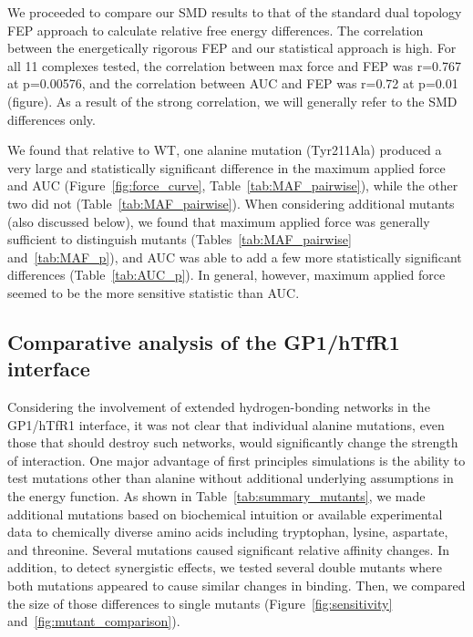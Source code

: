 \documentclass[12pt]{article}
\begin{document}
We proceeded to compare our SMD results to that of the standard dual topology FEP approach to calculate relative free energy differences. The correlation between the energetically rigorous FEP and our statistical approach is high. For all 11 complexes tested, the correlation between max force and FEP was r=0.767 at p=0.00576, and the correlation between AUC and FEP was r=0.72 at p=0.01 (figure). As a result of the strong correlation, we will generally refer to the SMD differences only.

We found that relative to WT, one alanine mutation (Tyr211Ala) produced a very large and statistically significant difference in the maximum applied force and AUC (Figure~\ref{fig:force_curve}, Table~\ref{tab:MAF_pairwise}), while the other two did not (Table~\ref{tab:MAF_pairwise}). When considering additional mutants (also discussed below), we found that maximum applied force was generally sufficient to distinguish mutants (Tables~\ref{tab:MAF_pairwise} and~\ref{tab:MAF_p}), and AUC was able to add a few more statistically significant differences (Table~\ref{tab:AUC_p}). In general, however, maximum applied force seemed to be the more sensitive statistic than AUC.

\subsection{Comparative analysis of the GP1/hTfR1 interface}
Considering the involvement of extended hydrogen-bonding networks in the GP1/hTfR1 interface, it was not clear that individual alanine mutations, even those that should destroy such networks, would significantly change the strength of interaction. One major advantage of first principles simulations is the ability to test mutations other than alanine without additional underlying assumptions in the energy function. As shown in Table~\ref{tab:summary_mutants}, we made additional mutations based on biochemical intuition or available experimental data to chemically diverse amino acids including tryptophan, lysine, aspartate, and threonine. Several mutations caused significant relative affinity changes. In addition, to detect synergistic effects, we tested several double mutants where both mutations appeared to cause similar changes in binding. Then, we compared the size of those differences to single mutants (Figure~\ref{fig:sensitivity} and~\ref{fig:mutant_comparison}).
\end{document}

